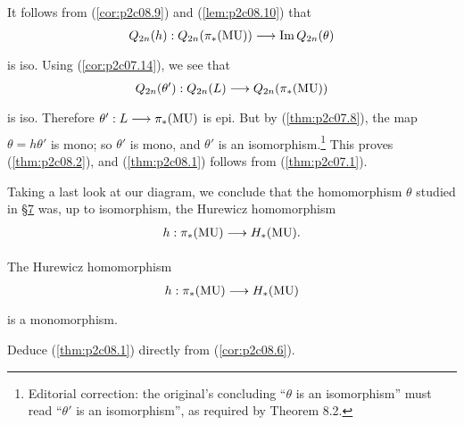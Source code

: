 \documentclass[../main]{subfiles}
\begin{document}
\begin{center}
\end{center}
It follows from (\ref{cor:p2c08.9}) and (\ref{lem:p2c08.10}) that \[Q_{2n}(h) : Q_{2n}(\pi_\ast(\mathrm{MU})) \lar{} \mathrm{Im} \, Q_{2n}(\theta)\] is iso. Using (\ref{cor:p2c07.14}), we see that \[Q_{2n}(\theta') : Q_{2n}(L) \lar{} Q_{2n}(\pi_\ast(\mathrm{MU}))\] is iso. Therefore $\theta':L\lar{}\pi_\ast(\mathrm{MU})$ is epi. But by (\ref{thm:p2c07.8}), the map $\theta = h \theta'$ is mono; so $\theta'$ is mono, and $\theta'$ is an isomorphism.\footnote{Editorial correction: the original's concluding ``$\theta$ is an isomorphism'' must read ``$\theta'$ is an isomorphism'', as required by Theorem 8.2.} This proves (\ref{thm:p2c08.2}), and (\ref{thm:p2c08.1}) follows from (\ref{thm:p2c07.1}).

Taking a last look at our diagram, we conclude that the homomorphism $\theta$ studied in \hyperref[sec:p2c7]{\S7} was, up to isomorphism, the Hurewicz homomorphism \[h : \pi_\ast(\mathrm{MU}) \lar{} H_\ast(\mathrm{MU}).\]

\begin{corollary}
\label{cor:p2c08.11}
The Hurewicz homomorphism \[h : \pi_\ast(\mathrm{MU}) \lar{} H_\ast(\mathrm{MU})\] is a monomorphism. 
\end{corollary}

\begin{exercise}
Deduce (\ref{thm:p2c08.1}) directly from (\ref{cor:p2c08.6}).
\end{exercise}
\end{document}
